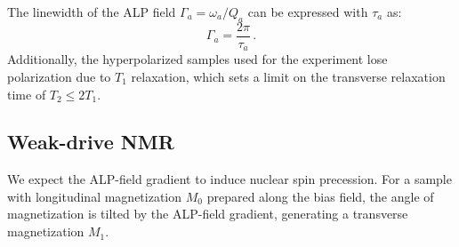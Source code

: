 \documentclass{WileyMSP-template}
\newcommand{\YZ}[1]{\textcolor{purple}{Yuzhe: #1}}
\newcommand{\AW}[1]{\textcolor{cyan}{Arne: #1}}
\newcommand{\AS}[1]{\textcolor{red}{Alex: #1}}
\begin{document}
	The linewidth of the ALP field $\Gamma_a = \omega_a/Q_a$ can be expressed with $\tau_a$ as:
	\begin{equation}
		\Gamma_a = \dfrac{2\pi}{\tau_a}
		\,.\label{eq:Gamma_a}
	\end{equation}
	Additionally, the hyperpolarized samples used for the experiment lose polarization due to $T_1$ relaxation, which sets a limit on the transverse relaxation time of $T_2\le 2T_1$.


	\subsection{Weak-drive NMR}

	We expect the ALP-field gradient to induce nuclear spin precession. 
	For a sample with longitudinal magnetization $M_{0}$ prepared along the bias field, the angle of magnetization is tilted by the ALP-field gradient, generating a transverse magnetization $M_{1}$. 
\end{document}
